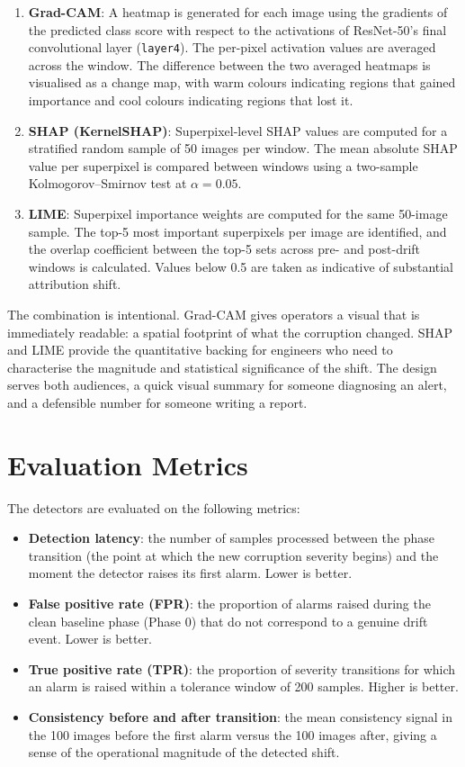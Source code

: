 \begin{enumerate}
  \item \textbf{Grad-CAM}: A heatmap is generated for each image using the gradients of the predicted class score with respect to the activations of ResNet-50's final convolutional layer (\texttt{layer4}). The per-pixel activation values are averaged across the window. The difference between the two averaged heatmaps is visualised as a change map, with warm colours indicating regions that gained importance and cool colours indicating regions that lost it.
  \item \textbf{SHAP (KernelSHAP)}: Superpixel-level SHAP values are computed for a stratified random sample of 50 images per window. The mean absolute SHAP value per superpixel is compared between windows using a two-sample Kolmogorov--Smirnov test at $\alpha = 0.05$.
  \item \textbf{LIME}: Superpixel importance weights are computed for the same 50-image sample. The top-5 most important superpixels per image are identified, and the overlap coefficient between the top-5 sets across pre- and post-drift windows is calculated. Values below 0.5 are taken as indicative of substantial attribution shift.
\end{enumerate}

The combination is intentional. Grad-CAM gives operators a visual that is immediately readable: a spatial footprint of what the corruption changed. SHAP and LIME provide the quantitative backing for engineers who need to characterise the magnitude and statistical significance of the shift. The design serves both audiences, a quick visual summary for someone diagnosing an alert, and a defensible number for someone writing a report.

\section{Evaluation Metrics}
\label{sec:evaluation}

The detectors are evaluated on the following metrics:

\begin{itemize}
  \item \textbf{Detection latency}: the number of samples processed between the phase transition (the point at which the new corruption severity begins) and the moment the detector raises its first alarm. Lower is better.
  \item \textbf{False positive rate (FPR)}: the proportion of alarms raised during the clean baseline phase (Phase 0) that do not correspond to a genuine drift event. Lower is better.
  \item \textbf{True positive rate (TPR)}: the proportion of severity transitions for which an alarm is raised within a tolerance window of 200 samples. Higher is better.
  \item \textbf{Consistency before and after transition}: the mean consistency signal in the 100 images before the first alarm versus the 100 images after, giving a sense of the operational magnitude of the detected shift.
\end{itemize}


